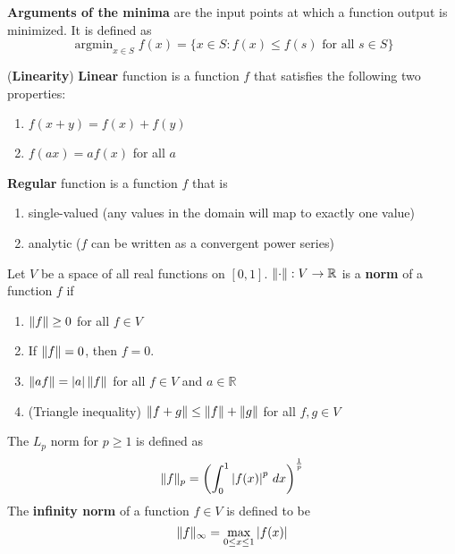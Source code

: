 \documentclass{huhtakm-template-book}
\DeclareMathOperator*{\argmin}{argmin}
\begin{document}
\begin{defn}
	\textbf{Arguments of the minima} are the input points at which a function output is minimized. It is defined as
	\begin{equation*}
		\argmin_{x\in S}f(x)=\{x\in S:f(x)\leq f(s)\text{ for all }s\in S\}
	\end{equation*}
\end{defn}
\begin{defn}(\textbf{Linearity})
	\textbf{Linear} function is a function $f$ that satisfies the following two properties:
	\begin{enumerate}
		\item $f(x+y)=f(x)+f(y)$
		\item $f(ax)=af(x)$ for all $a$
	\end{enumerate}
\end{defn}
\begin{defn}
	\textbf{Regular} function is a function $f$ that is
	\begin{enumerate}
		\item single-valued (any values in the domain will map to exactly one value)
		\item analytic ($f$ can be written as a convergent power series)
	\end{enumerate}
\end{defn}
\begin{defn}
	Let $V$ be a space of all real functions on $[0,1]$. $\lVert{\cdot}\rVert:V\to\mathbb{R}$ is a \textbf{norm} of a function $f$ if
	\begin{enumerate}
		\item $\lVert{f}\rVert\geq 0$ for all $f\in V$
		\item If $\lVert{f}\rVert=0$, then $f=0$.
		\item $\lVert{af}\rVert=\left|{a}\right|\lVert{f}\rVert$ for all $f\in V$ and $a\in\mathbb{R}$
		\item (Triangle inequality) $\lVert{f+g}\rVert\leq\lVert{f}\rVert+\lVert{g}\rVert$ for all $f,g\in V$
	\end{enumerate}
	The $L_{p}$ norm for $p\geq 1$ is defined as
	\begin{equation*}
		\lVert{f}\rVert_{p}=\left(\int_{0}^{1}\left|{f(x)}\right|^{p}\,dx\right)^{\frac{1}{p}}
	\end{equation*}
	The \textbf{infinity norm} of a function $f\in V$ is defined to be
	\begin{equation*}
		\lVert{f}\rVert_{\infty}=\max_{0\leq x\leq 1}\left|{f(x)}\right|
	\end{equation*}
\end{defn}
\end{document}
